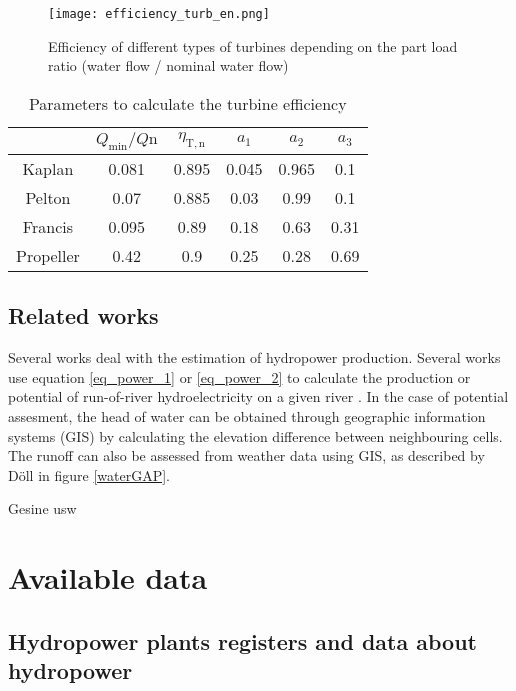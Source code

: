 \begin{figure}[H]
\texttt{[image: efficiency\_turb\_en.png]}
\caption[Efficiency of different types of turbines depending on the part load ratio]{Efficiency of different types of turbines depending on the part load ratio (water flow / nominal water flow) \cite{raa89}}
\centering
\label{efficiency_turb}
\end{figure}


\begin{table}
 \caption[Parameters to calculate the turbine efficiency]{Parameters to calculate the turbine efficiency \cite{quaschning}}
 \label{eff_param}
 \centering
 \begin{tabular}{|c|c|c|c|c|c|}
  \cline{2-6}
  \multicolumn{1}{c|}{}&$Q_\mathrm{min} / Q\mathrm{n}$ & $\eta_\mathrm{T,n}$& $a_\mathrm{1}$ & $a_\mathrm{2}$&$a_\mathrm{3}$ \\ 
  \hline
  Kaplan & 0.081& 0.895& 0.045 &0.965& 0.1 \\
  Pelton & 0.07& 0.885& 0.03& 0.99& 0.1\\
  Francis &0.095 &0.89 &0.18 &0.63 &0.31 \\
  Propeller &0.42 &0.9 &0.25 &0.28 &0.69\\
  \hline
 \end{tabular}
\end{table}

\subsection{Related works}
Several works deal with the estimation of hydropower production. 
Several works use equation \ref{eq_power_1} or \ref{eq_power_2} to calculate the production or potential of run-of-river hydroelectricity on a given river \cite{hammid} \cite{bayazit} \cite{garrido}. In the case of potential assesment, the head of water can be obtained through geographic information systems (GIS) by calculating the elevation difference between neighbouring cells. The runoff can also be assessed from weather data using GIS, as described by Döll in figure \ref{waterGAP}.


Gesine usw

\section{Available data}

\subsection{Hydropower plants registers and data about hydropower}
\label{hpp_register}

